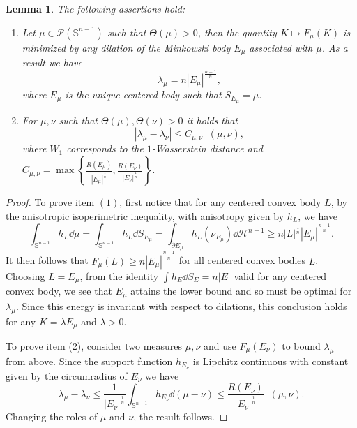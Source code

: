 \documentclass[a4paper, 10pt, twoside]{amsart}
\numberwithin{equation}{section}
\newcommand{\lemmname}{Lemma}
\theoremstyle{plain}
\newtheorem{lemma}[theorem]{\lemmname}
\theoremstyle{definition}
\DeclareMathOperator{\dc}{\mathrm{d}_\mathrm{C}}
\begin{document}
\begin{lemma}\label{lemma.variational_problem}
    The following assertions hold: 
    \begin{enumerate}
        \item Let $\mu \in \mathscr{P}(\mathbb{S}^{n-1})$ such that $\Theta(\mu) > 0$, then the quantity $K \mapsto F_\mu(K)$ is minimized by any dilation of the Minkowski body $E_\mu$ associated with $\mu$. As a result we have 
        \[
            \lambda_\mu = n {|E_\mu|}^{\frac{n-1}{n}}, 
        \]
        where $E_\mu$ is the unique centered body such that $S_{E_\mu} = \mu$.
        \item For $\mu,\nu$ such that $\Theta(\mu),\Theta(\nu) > 0$ it holds that 
        \[
            |\lambda_\mu - \lambda_\nu| 
            \le 
            C_{\mu,\nu} \dc(\mu,\nu),
        \]
        where $W_1$ corresponds to the $1$-Wasserstein distance and $C_{\mu,\nu} =  \max\left\{\frac{R(E_\mu)}{|E_\mu|^{\frac{1}{n}}}, \frac{R(E_\nu)}{|E_\nu|^{\frac{1}{n}}}  \right\}$. 
    \end{enumerate}
\end{lemma}
\begin{proof}
    To prove item $(1)$, first notice that for any centered convex body $L$, by the anisotropic isoperimetric inequality, with anisotropy given by $h_L$, we have 
    \[
        \int_{\mathbb{S}^{n-1}} h_L \dd \mu 
        = 
        \int_{\mathbb{S}^{n-1}} h_L \dd S_{E_\mu} 
        = 
        \int_{\partial E_\mu} h_L(\nu_{E_\mu}) \dd \mathcal{H}^{n-1} 
        \ge 
        n{|L|}^{\frac{1}{n}} {|E_\mu|}^{\frac{n-1}{n}}. 
    \]
    It then follows that $F_\mu(L) \ge n|E_\mu|^{\frac{n-1}{n}}$ for all centered convex bodies $L$. Choosing $L = E_\mu$, from the identity $\int h_E \dd S_E = n|E|$ valid for any centered convex body, we see that $E_\mu$ attains the lower bound and so must be optimal for $\lambda_\mu$. Since this energy is invariant with respect to dilations, this conclusion holds for any $K = \lambda E_\mu$ and $\lambda > 0$. 
    
    To prove item (2), consider two measures $\mu,\nu$ and use $F_\mu(E_\nu)$ to bound $\lambda_\mu$ from above. Since the support function $h_{E_\nu}$ is Lipchitz continuous with constant given by the circumradius of $E_\nu$ we have 
    \[
        \lambda_\mu - \lambda_\nu 
        \le 
        \frac{1}{|E_\nu|^{\frac{1}{n}}} 
        \int_{\mathbb{S}^{n-1}} h_{E_\nu} \dd (\mu - \nu)
        \le 
        \frac{R(E_\nu)}{|E_\nu|^{\frac{1}{n}}} \dc(\mu,\nu). 
    \]
    Changing the roles of $\mu$ and $\nu$, the result follows. 
\end{proof}
\end{document}
